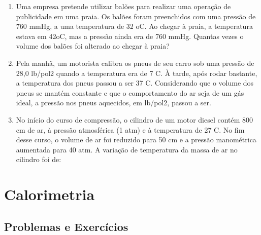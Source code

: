 \documentclass[12pt,a4paper]{book}
\begin{document}
\begin{enumerate}
\item Uma empresa pretende utilizar balões para realizar uma operação de publicidade em uma praia. Os balões foram preenchidos com uma pressão de 760 mmHg, a uma temperatura de 32 oC. Ao chegar à praia, a temperatura estava em 42oC, mas a pressão ainda era de 760 mmHg. Quantas vezes o volume dos balões foi alterado ao chegar à praia?
\item Pela manhã, um motorista calibra os pneus de seu carro sob uma pressão de 28,0 lb/pol2 quando a temperatura era de 7 C. À tarde, após rodar bastante, a temperatura dos pneus passou a ser 37 C. Considerando que o volume dos pneus se mantém constante e que o comportamento do ar seja de um gás ideal, a pressão nos pneus aquecidos, em lb/pol2, passou a ser. 
\item No início do curso de compressão, o cilindro de um motor diesel contém 800 cm de ar, à pressão atmosférica (1 atm) e à temperatura de 27 C. No fim desse curso, o volume de ar foi reduzido para 50 cm e a pressão manométrica aumentada para 40 atm. A variação de temperatura da massa de ar no cilindro foi de: 

\end{enumerate}


\chapter{Calorimetria}

	\newpage \section{Problemas e Exercícios}
	
\end{document}
